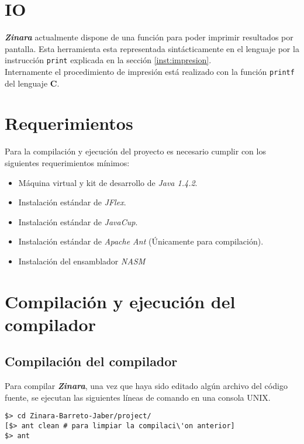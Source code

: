 \documentclass[12pt, spanish]{report}
\begin{document}
\chapter{IO}
\label{chap:io}

\emph{\textbf{Zinara}} actualmente dispone de una función para poder
imprimir resultados por pantalla. Esta herramienta esta representada
sintácticamente en el lenguaje por la instrucción \texttt{print}
explicada en la sección \ref{inst:impresion}.\\

Internamente el procedimiento de impresión está realizado con la
función \texttt{printf} del lenguaje \textbf{C}.

\chapter{Requerimientos}
\label{sec:requ}

Para la compilaci\'on y ejecuci\'on del proyecto es necesario cumplir con
los siguientes requerimientos m\'inimos:

\begin{itemize}
\item M\'aquina virtual y kit de desarrollo de \emph{Java 1.4.2}.
\item Instalaci\'on est\'andar de \emph{JFlex}.
\item Instalaci\'on est\'andar de \emph{JavaCup}.
\item Instalaci\'on est\'andar de \emph{Apache Ant} (\'Unicamente para
  compilaci\'on).
\item Instalación del ensamblador \emph{NASM}
\end{itemize}

\chapter{Compilaci\'on y ejecuci\'on del compilador}
\section{Compilaci\'on del compilador}
\label{sec:compilacion}
Para compilar \emph{\textbf{Zinara}}, una vez que haya sido editado
alg\'un archivo del c\'odigo fuente, se ejecutan las siguientes l\'ineas de
comando en una consola UNIX.

\begin{verbatim}
$> cd Zinara-Barreto-Jaber/project/
[$> ant clean # para limpiar la compilaci\'on anterior]
$> ant
\end{verbatim}
\end{document}

